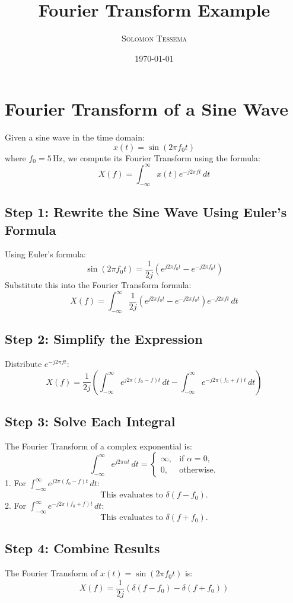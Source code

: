 \documentclass[letterpaper, 11pt]{article} %
\title{\textbf{Fourier Transform Example}} %
\author{\textsc{Solomon Tessema}}         %
\date{\today}
\begin{document}
\maketitle

\section*{Fourier Transform of a Sine Wave}

Given a sine wave in the time domain:
\[
x(t) = \sin(2 \pi f_0 t)
\]
where \( f_0 = 5 \, \text{Hz} \), we compute its Fourier Transform using the formula:
\[
X(f) = \int_{-\infty}^\infty x(t) e^{-j 2 \pi f t} \, dt
\]

\subsection*{Step 1: Rewrite the Sine Wave Using Euler's Formula}
Using Euler's formula:
\[
\sin(2 \pi f_0 t) = \frac{1}{2j} \left( e^{j 2 \pi f_0 t} - e^{-j 2 \pi f_0 t} \right)
\]
Substitute this into the Fourier Transform formula:
\[
X(f) = \int_{-\infty}^\infty \frac{1}{2j} \left( e^{j 2 \pi f_0 t} - e^{-j 2 \pi f_0 t} \right) e^{-j 2 \pi f t} \, dt
\]

\subsection*{Step 2: Simplify the Expression}
Distribute \( e^{-j 2 \pi f t} \):
\[
X(f) = \frac{1}{2j} \left( \int_{-\infty}^\infty e^{j 2 \pi (f_0 - f) t} \, dt - \int_{-\infty}^\infty e^{-j 2 \pi (f_0 + f) t} \, dt \right)
\]

\subsection*{Step 3: Solve Each Integral}
The Fourier Transform of a complex exponential is:
\[
\int_{-\infty}^\infty e^{j 2 \pi \alpha t} \, dt =
\begin{cases} 
    \infty, & \text{if } \alpha = 0, \\
    0, & \text{otherwise}.
\end{cases}
\]
1. For \( \int_{-\infty}^\infty e^{j 2 \pi (f_0 - f) t} \, dt \):
   \[
   \text{This evaluates to } \delta(f - f_0).
   \]
2. For \( \int_{-\infty}^\infty e^{-j 2 \pi (f_0 + f) t} \, dt \):
   \[
   \text{This evaluates to } \delta(f + f_0).
   \]

\subsection*{Step 4: Combine Results}
The Fourier Transform of \( x(t) = \sin(2 \pi f_0 t) \) is:
\[
X(f) = \frac{1}{2j} \left( \delta(f - f_0) - \delta(f + f_0) \right)
\]
\end{document}
